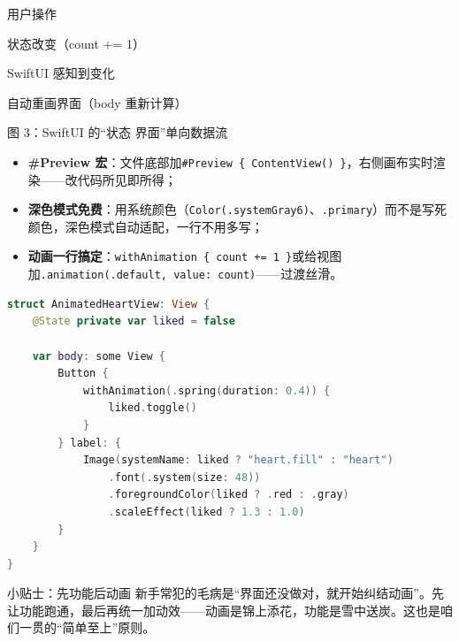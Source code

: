 用户操作

状态改变（count += 1）

SwiftUI 感知到变化

自动重画界面（body 重新计算）

\begin{center}\small\color{gray}图 3：SwiftUI 的“状态 界面”单向数据流\end{center}


\begin{itemize}
  \item \textbf{\#Preview 宏}：文件底部加\texttt{\#Preview \{ ContentView() \}}，右侧画布实时渲染——改代码所见即所得；
  \item \textbf{深色模式免费}：用系统颜色（\texttt{Color(.\allowbreak systemGray6)}、\texttt{.\allowbreak primary}）而不是写死颜色，深色模式自动适配，一行不用多写；
  \item \textbf{动画一行搞定}：\texttt{withAnimation \{ count += 1 \}}或给视图加\texttt{.\allowbreak animation(.\allowbreak default, value: count)}——过渡丝滑。
\end{itemize}

\begin{lstlisting}[language=Swift]
struct AnimatedHeartView: View {
    @State private var liked = false

    var body: some View {
        Button {
            withAnimation(.spring(duration: 0.4)) {
                liked.toggle()
            }
        } label: {
            Image(systemName: liked ? "heart.fill" : "heart")
                .font(.system(size: 48))
                .foregroundColor(liked ? .red : .gray)
                .scaleEffect(liked ? 1.3 : 1.0)
        }
    }
}
\end{lstlisting}

\begin{tcbinfo}{小贴士：先功能后动画}
新手常犯的毛病是“界面还没做对，就开始纠结动画”。先让功能跑通，最后再统一加动效——动画是锦上添花，功能是雪中送炭。这也是咱们一贯的“简单至上”原则。

\end{tcbinfo}

